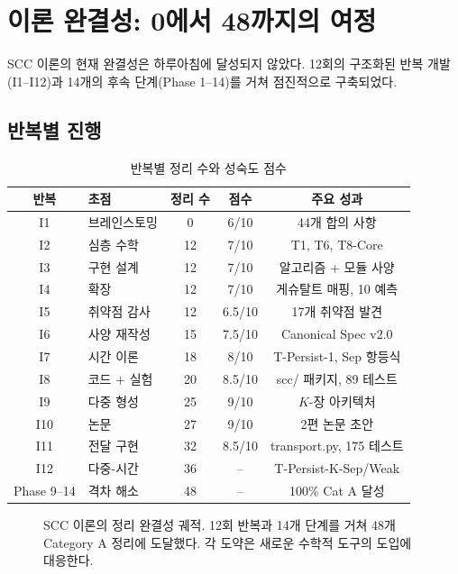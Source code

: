 \section{이론 완결성: 0에서 48까지의 여정}
\label{sec:completeness-journey}

SCC 이론의 현재 완결성은 하루아침에 달성되지 않았다. 12회의 구조화된 반복 개발(I1--I12)과 14개의 후속 단계(Phase 1--14)를 거쳐 점진적으로 구축되었다.

\subsection{반복별 진행}

\begin{table}[h]
\centering
\caption{반복별 정리 수와 성숙도 점수}
\label{tab:iteration-progress}
\small
\begin{tabular}{clccc}
\toprule
\textbf{반복} & \textbf{초점} & \textbf{정리 수} & \textbf{점수} & \textbf{주요 성과} \\
\midrule
I1 & 브레인스토밍 & 0 & 6/10 & 44개 합의 사항 \\
I2 & 심층 수학 & 12 & 7/10 & T1, T6, T8-Core \\
I3 & 구현 설계 & 12 & 7/10 & 알고리즘 + 모듈 사양 \\
I4 & 확장 & 12 & 7/10 & 게슈탈트 매핑, 10 예측 \\
I5 & 취약점 감사 & 12 & 6.5/10 & 17개 취약점 발견 \\
I6 & 사양 재작성 & 15 & 7.5/10 & Canonical Spec v2.0 \\
I7 & 시간 이론 & 18 & 8/10 & T-Persist-1, Sep 항등식 \\
I8 & 코드 + 실험 & 20 & 8.5/10 & scc/ 패키지, 89 테스트 \\
I9 & 다중 형성 & 25 & 9/10 & $K$-장 아키텍처 \\
I10 & 논문 & 27 & 9/10 & 2편 논문 초안 \\
I11 & 전달 구현 & 32 & 8.5/10 & transport.py, 175 테스트 \\
I12 & 다중-시간 & 36 & -- & T-Persist-K-Sep/Weak \\
\midrule
Phase 9--14 & 격차 해소 & 48 & -- & 100\% Cat A 달성 \\
\bottomrule
\end{tabular}
\end{table}

\begin{figure}[t]
\centering
{}
\caption{SCC 이론의 정리 완결성 궤적. 12회 반복과 14개 단계를 거쳐 48개 Category A 정리에 도달했다. 각 도약은 새로운 수학적 도구의 도입에 대응한다.}
\label{fig:completeness-trajectory}
\end{figure}

